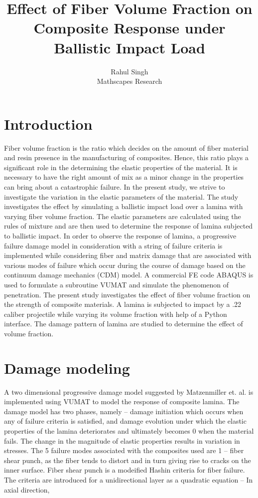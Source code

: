 \documentclass[a4paper,11pt, hidelinks]{article}
\date{\displaydate{date}}					%
\title{Effect of Fiber Volume Fraction on Composite Response under Ballistic Impact Load}
\author{ 
	Rahul Singh \\
	\small{Mathscapes Research}\\
}
\begin{document}
\maketitle
\thispagestyle{fancy}

\section{Introduction}
Fiber volume fraction is the ratio which decides on the amount of fiber material and resin presence in the manufacturing of composites. Hence, this ratio plays a significant role in the determining the elastic properties of the material. It is necessary to have the right amount of mix as a minor change in the properties can bring about a catastrophic failure. In the present study, we strive to investigate the variation in the elastic parameters of the material. The study investigates the effect by simulating a ballistic impact load over a lamina with varying fiber volume fraction. The elastic parameters are calculated using the rules of mixture and are then used to determine the response of lamina subjected to ballistic impact. In order to observe the response of lamina, a progressive failure damage model in consideration with a string of failure criteria is implemented while considering fiber and matrix damage that are associated with various modes of failure which occur during the course of damage based on the continuum damage mechanics (CDM) model. A commercial FE code ABAQUS is used to formulate a subroutine VUMAT and simulate the phenomenon of penetration.  The present study investigates the effect of fiber volume fraction on the strength of composite materials. A lamina is subjected to impact by a .22 caliber projectile while varying its volume fraction with help of a Python interface. The damage pattern of lamina are studied to determine the effect of volume fraction.

\section{Damage modeling}
A two dimensional progressive damage model suggested by Matzenmiller et. al.\cite{Matzenmiller1995} is implemented using VUMAT to model the response of composite lamina. The damage model has two phases, namely – damage initiation which occurs when any of failure criteria is satisfied, and damage evolution under which the elastic properties of the lamina deteriorates and ultimately becomes 0 when the material fails. The change in the magnitude of elastic properties results in variation in stresses. The 5 failure modes associated with the composites used are 1 – fiber shear punch, as the fiber tends to distort and in turn giving rise to cracks on the inner surface. Fiber shear punch is a modeified Hashin\cite{Hashin1980} criteria for fiber failure. The criteria are introduced for a unidirectional layer as a quadratic equation –
In axial direction,
\end{document}
